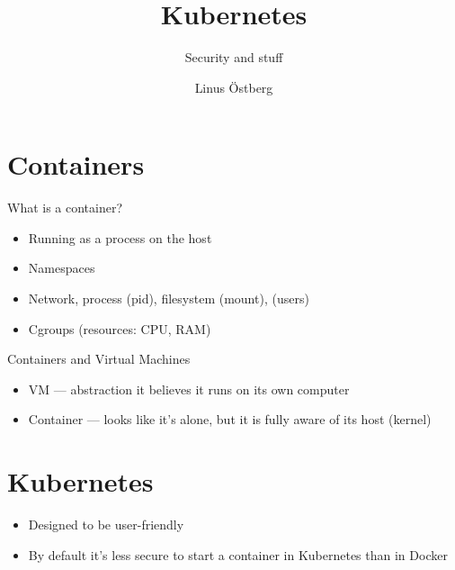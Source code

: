 \documentclass{dcpresentation}
\title{Kubernetes}
\subtitle{Security and stuff}
\author{Linus Östberg}
\institute{SciLifeLab Data Centre}
\date{}
\begin{document}
 \begin{frame}
  \maketitle
 \end{frame}
 

\begin{frame}
 \tableofcontents
\end{frame}

\section{Containers}
 
\begin{frame}{What is a container?}
 \begin{itemize}
  \item Running as a process on the host
  \item Namespaces
  \item Network, process (pid), filesystem (mount), (users)
  \item Cgroups (resources: CPU, RAM)
 \end{itemize}
\end{frame}

\begin{frame}{Containers and Virtual Machines}
 \begin{itemize}
  \item VM --- abstraction it believes it runs on its own computer
  \item Container --- looks like it's alone, but it is fully aware of its host (kernel)
 \end{itemize}
\end{frame}

\section{Kubernetes}

\begin{frame}
 \begin{itemize}
  \item Designed to be user-friendly
  \item By default it's less secure to start a container in Kubernetes than in Docker
 \end{itemize}
\end{frame}
\end{document}
